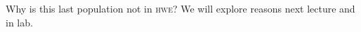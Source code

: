 \documentclass[t]{beamer}
\begin{document}
\begin{frame}{Why is this last population not in \textsc{hwe}?}
%
	\hangpara We will explore reasons next lecture and in lab.
	
%	
%	
\end{frame}
\end{document}

